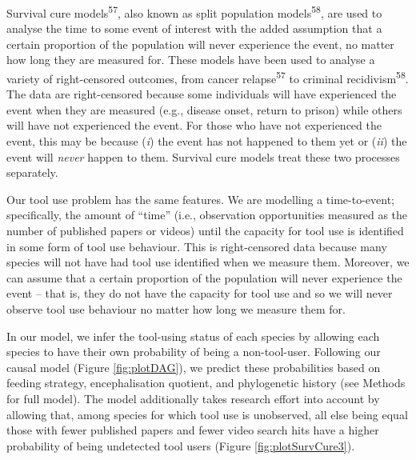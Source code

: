 \documentclass[
  man, donotrepeattitle,floatsintext]{apa6}
\begin{document}
Survival cure models\textsuperscript{57}, also known as split population
models\textsuperscript{58}, are used to analyse the time to some event of interest
with the added assumption that a certain proportion of the population will never
experience the event, no matter how long they are measured for. These models
have been used to analyse a variety of right-censored outcomes, from cancer
relapse\textsuperscript{57} to criminal recidivism\textsuperscript{58}. The data are
right-censored because some individuals will have experienced the event when
they are measured (e.g., disease onset, return to prison) while others will have
not experienced the event. For those who have not experienced the event, this
may be because (\emph{i}) the event has not happened to them yet or (\emph{ii}) the event
will \emph{never} happen to them. Survival cure models treat these two processes
separately.

Our tool use problem has the same features. We are modelling a time-to-event;
specifically, the amount of ``time'' (i.e., observation opportunities measured as
the number of published papers or videos) until the capacity for tool use is
identified in some form of tool use behaviour. This is right-censored data
because many species will not have had tool use identified when we measure them.
Moreover, we can assume that a certain proportion of the population will never
experience the event -- that is, they do not have the capacity for tool use and
so we will never observe tool use behaviour no matter how long we measure them
for.

In our model, we infer the tool-using status of each species by allowing each
species to have their own probability of being a non-tool-user. Following our
causal model (Figure \ref{fig:plotDAG}), we predict these probabilities based
on feeding strategy, encephalisation quotient, and phylogenetic history (see
Methods for full model). The model additionally takes research effort into
account by allowing that, among species for which tool use is unobserved, all
else being equal those with fewer published papers and fewer video search hits
have a higher probability of being undetected tool users (Figure
\ref{fig:plotSurvCure3}).
\end{document}
